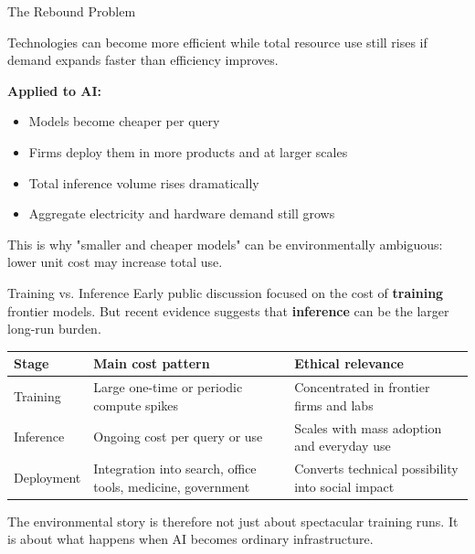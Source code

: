 \documentclass[aspectratio=169,11pt]{beamer}
\begin{document}
\begin{frame}{The Rebound Problem}
\begin{conceptbox}
Technologies can become more efficient while total resource use still rises if demand expands faster than efficiency improves.
\end{conceptbox}

\vspace{0.2cm}
\textbf{Applied to AI:}
\begin{itemize}
    \item Models become cheaper per query
    \item Firms deploy them in more products and at larger scales
    \item Total inference volume rises dramatically
    \item Aggregate electricity and hardware demand still grows
\end{itemize}

\vspace{0.2cm}
This is why "smaller and cheaper models" can be environmentally ambiguous: lower unit cost may increase total use.
\end{frame}

\begin{frame}{Training vs. Inference}
Early public discussion focused on the cost of \textbf{training} frontier models. But recent evidence suggests that \textbf{inference} can be the larger long-run burden.

\vspace{0.2cm}
\begin{table}[h]
\centering
\scriptsize
\begin{tabular}{@{}p{3cm}p{4.3cm}p{4.3cm}@{}}
\toprule
\textbf{Stage} & \textbf{Main cost pattern} & \textbf{Ethical relevance} \\
\midrule
Training & Large one-time or periodic compute spikes & Concentrated in frontier firms and labs \\
\addlinespace
Inference & Ongoing cost per query or use & Scales with mass adoption and everyday use \\
\addlinespace
Deployment & Integration into search, office tools, medicine, government & Converts technical possibility into social impact \\
\bottomrule
\end{tabular}
\end{table}

\vspace{0.2cm}
The environmental story is therefore not just about spectacular training runs. It is about what happens when AI becomes ordinary infrastructure.
\end{frame}
\end{document}
